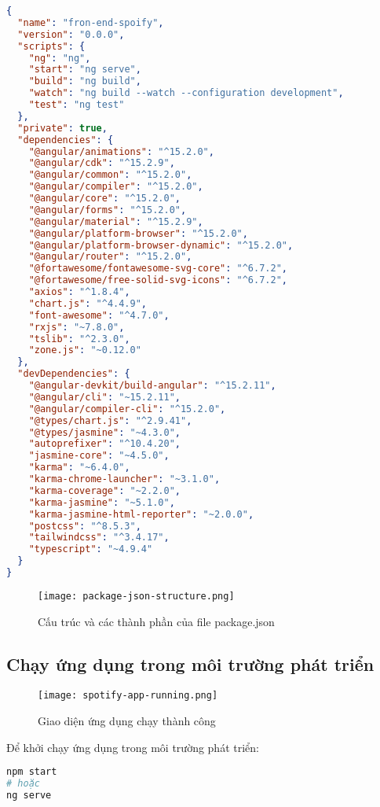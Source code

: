\documentclass[12pt,a4paper]{article}
\begin{document}
\begin{lstlisting}[language=json]
{
  "name": "fron-end-spoify",
  "version": "0.0.0",
  "scripts": {
    "ng": "ng",
    "start": "ng serve",
    "build": "ng build",
    "watch": "ng build --watch --configuration development",
    "test": "ng test"
  },
  "private": true,
  "dependencies": {
    "@angular/animations": "^15.2.0",
    "@angular/cdk": "^15.2.9",
    "@angular/common": "^15.2.0",
    "@angular/compiler": "^15.2.0",
    "@angular/core": "^15.2.0",
    "@angular/forms": "^15.2.0",
    "@angular/material": "^15.2.9",
    "@angular/platform-browser": "^15.2.0",
    "@angular/platform-browser-dynamic": "^15.2.0",
    "@angular/router": "^15.2.0",
    "@fortawesome/fontawesome-svg-core": "^6.7.2",
    "@fortawesome/free-solid-svg-icons": "^6.7.2",
    "axios": "^1.8.4",
    "chart.js": "^4.4.9",
    "font-awesome": "^4.7.0",
    "rxjs": "~7.8.0",
    "tslib": "^2.3.0",
    "zone.js": "~0.12.0"
  },
  "devDependencies": {
    "@angular-devkit/build-angular": "^15.2.11",
    "@angular/cli": "~15.2.11",
    "@angular/compiler-cli": "^15.2.0",
    "@types/chart.js": "^2.9.41",
    "@types/jasmine": "~4.3.0",
    "autoprefixer": "^10.4.20",
    "jasmine-core": "~4.5.0",
    "karma": "~6.4.0",
    "karma-chrome-launcher": "~3.1.0",
    "karma-coverage": "~2.2.0",
    "karma-jasmine": "~5.1.0",
    "karma-jasmine-html-reporter": "~2.0.0",
    "postcss": "^8.5.3",
    "tailwindcss": "^3.4.17",
    "typescript": "~4.9.4"
  }
}
\end{lstlisting}

\begin{figure}[h]
\centering
\texttt{[image: package-json-structure.png]}
\caption{Cấu trúc và các thành phần của file package.json}
\end{figure}

\subsection{Chạy ứng dụng trong môi trường phát triển}

\begin{figure}[h]
\centering
\texttt{[image: spotify-app-running.png]}
\caption{Giao diện ứng dụng chạy thành công}
\end{figure}

Để khởi chạy ứng dụng trong môi trường phát triển:

\begin{lstlisting}[language=bash]
npm start
# hoặc
ng serve
\end{lstlisting}
\end{document}
